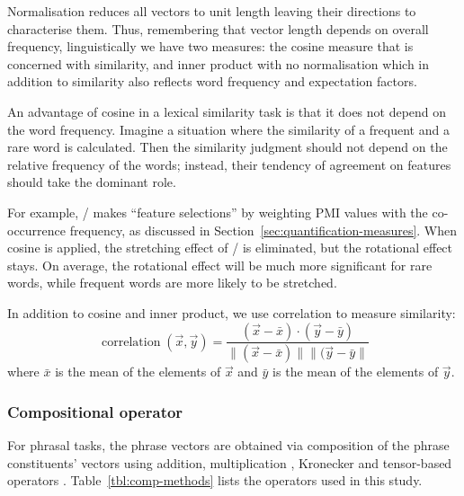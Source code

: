 Normalisation reduces all vectors to unit length leaving their directions to characterise them. Thus, remembering that vector length depends on overall frequency, linguistically we have two measures: the cosine measure that is concerned with similarity, and inner product with no normalisation which in addition to similarity also reflects word frequency and expectation factors.
%
%

An advantage of cosine in a lexical similarity task is that it does not depend on the word frequency. Imagine a situation where the similarity of a frequent and a rare word is calculated. Then the similarity judgment should not depend on the relative frequency of the words; instead, their tendency of agreement on features should take the dominant role.

For example, \NPMI/ makes ``feature selections'' by weighting PMI values with the co-occurrence frequency, as discussed in Section~\ref{sec:quantification-measures}. When cosine is applied, the stretching effect of \NPMI/ is eliminated, but the rotational effect stays. On average, the rotational effect will be much more significant for rare words, while frequent words are more likely to be stretched.

In addition to cosine and inner product, we use correlation \cite{kiela-clark:2014:CVSC} to measure similarity:
\begin{equation*}
  \label{eq:correlation}
  \operatorname{correlation}(\vec{x}, \vec{y}) = \frac{(\vec{x} - \bar{x}) \cdot (\vec{y} - \bar{y})}
                                {\|(\vec{x} - \bar{x})\| \|(\vec{y}-\bar{y}\|}
\end{equation*}
where $\bar{x}$ is the mean of the elements of $\vec{x}$ and $\bar{y}$ is the mean of the elements of $\vec{y}$.

\subsubsection{Compositional operator}
\label{sec:comp-oper}



For phrasal tasks, the phrase vectors are obtained via composition of the phrase constituents' vectors using addition, multiplication \cite{mitchell2010composition,mitchell-lapata:2008:ACLMain}, Kronecker \cite{Grefenstette:2011:ESC:2145432.2145580} and tensor-based operators \cite{DBLP:journals/corr/abs-1003-4394,kartsadrqpl2014,kartsaklis-sadrzadeh-pulman:2012:POSTERS,Grefenstette:2011:ESC:2145432.2145580}. Table~\ref{tbl:comp-methods} lists the operators used in this study.


